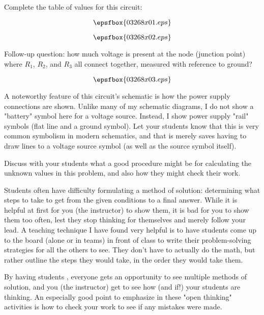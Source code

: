 

Complete the table of values for this circuit:

$$\epsfbox{03268x01.eps}$$







$$\epsfbox{03268x02.eps}$$

\vskip 10pt

Follow-up question: how much voltage is present at the node (junction point) where $R_1$, $R_2$, and $R_3$ all connect together, measured with reference to ground?

$$\epsfbox{03268x03.eps}$$







A noteworthy feature of this circuit's schematic is how the power supply connections are shown.  Unlike many of my schematic diagrams, I do not show a "battery" symbol here for a voltage source.  Instead, I show power supply "rail" symbols (flat line and a ground symbol).  Let your students know that this is very common symbolism in modern schematics, and that is merely saves having to draw lines to a voltage source symbol (as well as the source symbol itself).

\vskip 10pt

Discuss with your students what a good procedure might be for calculating the unknown values in this problem, and also how they might check their work.

\vskip 10pt

Students often have difficulty formulating a method of solution: determining what steps to take to get from the given conditions to a final answer.  While it is helpful at first for you (the instructor) to show them, it is bad for you to show them too often, lest they stop thinking for themselves and merely follow your lead.  A teaching technique I have found very helpful is to have students come up to the board (alone or in teams) in front of class to write their problem-solving strategies for all the others to see.  They don't have to actually do the math, but rather outline the steps they would take, in the order they would take them.

By having students , everyone gets an opportunity to see multiple methods of solution, and you (the instructor) get to see how (and if!) your students are thinking.  An especially good point to emphasize in these "open thinking" activities is how to check your work to see if any mistakes were made.



